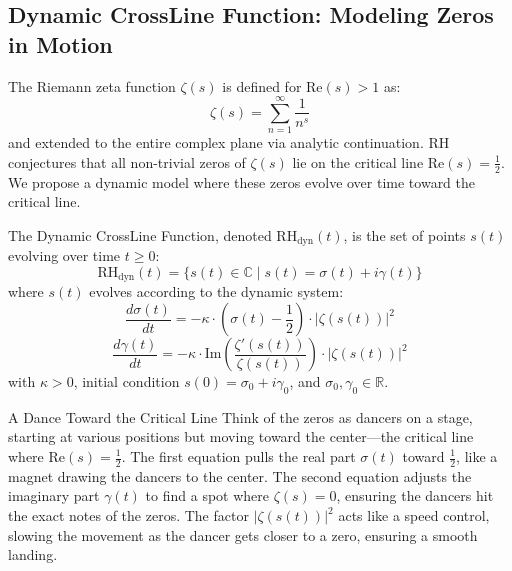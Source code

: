 \documentclass[12pt]{article}
\begin{document}
{{{\begin{onehalfspace}
\section{Dynamic CrossLine Function: Modeling Zeros in Motion}

The Riemann zeta function \(\zeta(s)\) is defined for \(\text{Re}(s) > 1\) as:
\[
\zeta(s) = \sum_{n=1}^\infty \frac{1}{n^s}
\]
and extended to the entire complex plane via analytic continuation. RH conjectures that all non-trivial zeros of \(\zeta(s)\) lie on the critical line \(\text{Re}(s) = \frac{1}{2}\). We propose a dynamic model where these zeros evolve over time toward the critical line.

\begin{definition}
The Dynamic CrossLine Function, denoted \(\text{RH}_{\text{dyn}}(t)\), is the set of points \( s(t) \) evolving over time \( t \geq 0 \):
\[
\text{RH}_{\text{dyn}}(t) = \{ s(t) \in \mathbb{C} \mid s(t) = \sigma(t) + i \gamma(t) \}
\]
where \( s(t) \) evolves according to the dynamic system:
\[
\frac{d\sigma(t)}{dt} = -\kappa \cdot \left( \sigma(t) - \frac{1}{2} \right) \cdot |\zeta(s(t))|^2
\]
\[
\frac{d\gamma(t)}{dt} = -\kappa \cdot \text{Im} \left( \frac{\zeta'(s(t))}{\zeta(s(t))} \right) \cdot |\zeta(s(t))|^2
\]
with \(\kappa > 0\), initial condition \( s(0) = \sigma_0 + i \gamma_0 \), and \(\sigma_0, \gamma_0 \in \mathbb{R}\).
\end{definition}

A Dance Toward the Critical Line
Think of the zeros as dancers on a stage, starting at various positions but moving toward the center—the critical line where \(\text{Re}(s) = \frac{1}{2}\). The first equation pulls the real part \(\sigma(t)\) toward \(\frac{1}{2}\), like a magnet drawing the dancers to the center. The second equation adjusts the imaginary part \(\gamma(t)\) to find a spot where \(\zeta(s) = 0\), ensuring the dancers hit the exact notes of the zeros. The factor \( |\zeta(s(t))|^2 \) acts like a speed control, slowing the movement as the dancer gets closer to a zero, ensuring a smooth landing.


\end{onehalfspace}}}}
\end{document}
